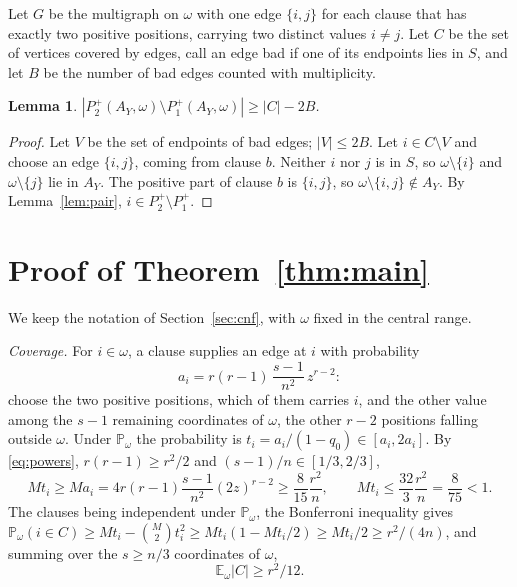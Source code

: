 \documentclass[11pt]{amsart}
\newtheorem{lemma}[theorem]{Lemma}
\theoremstyle{definition}
\theoremstyle{remark}
\numberwithin{equation}{section}
\newcommand{\Pp}{\mathbb P}
\newcommand{\E}{\mathbb E}
\begin{document}
Let $G$ be the multigraph on $\omega$ with one edge $\{i,j\}$ for each clause that has exactly two positive positions, carrying two distinct values $i\ne j$. Let $C$ be the set of vertices covered by edges, call an edge bad if one of its endpoints lies in $S$, and let $B$ be the number of bad edges counted with multiplicity.

\begin{lemma}\label{lem:graph}
$|P_2^+(A_Y,\omega)\setminus P_1^+(A_Y,\omega)|\ge|C|-2B$.
\end{lemma}

\begin{proof}
Let $V$ be the set of endpoints of bad edges; $|V|\le2B$. Let $i\in C\setminus V$ and choose an edge $\{i,j\}$, coming from clause $b$. Neither $i$ nor $j$ is in $S$, so $\omega\setminus\{i\}$ and $\omega\setminus\{j\}$ lie in $A_Y$. The positive part of clause $b$ is $\{i,j\}$, so $\omega\setminus\{i,j\}\notin A_Y$. By Lemma~\ref{lem:pair}, $i\in P_2^+\setminus P_1^+$.
\end{proof}

\section{Proof of Theorem~\ref{thm:main}}

We keep the notation of Section~\ref{sec:cnf}, with $\omega$ fixed in the central range.

\emph{Coverage.} For $i\in\omega$, a clause supplies an edge at $i$ with probability
\[
a_i=r(r-1)\,\frac{s-1}{n^2}\,z^{r-2}:
\]
choose the two positive positions, which of them carries $i$, and the other value among the $s-1$ remaining coordinates of $\omega$, the other $r-2$ positions falling outside $\omega$. Under $\Pp_\omega$ the probability is $t_i=a_i/(1-q_0)\in[a_i,2a_i]$. By \eqref{eq:powers}, $r(r-1)\ge r^2/2$ and $(s-1)/n\in[1/3,2/3]$,
\[
Mt_i\ge Ma_i=4r(r-1)\frac{s-1}{n^2}(2z)^{r-2}\ge\frac{8}{15}\frac{r^2}{n},\qquad Mt_i\le\frac{32}{3}\frac{r^2}{n}=\frac{8}{75}<1 .
\]
The clauses being independent under $\Pp_\omega$, the Bonferroni inequality gives $\Pp_\omega(i\in C)\ge Mt_i-\binom M2t_i^2\ge Mt_i(1-Mt_i/2)\ge Mt_i/2\ge r^2/(4n)$, and summing over the $s\ge n/3$ coordinates of $\omega$,
\begin{equation}\label{eq:C}
\E_\omega|C|\ge r^2/12 .
\end{equation}
\end{document}
